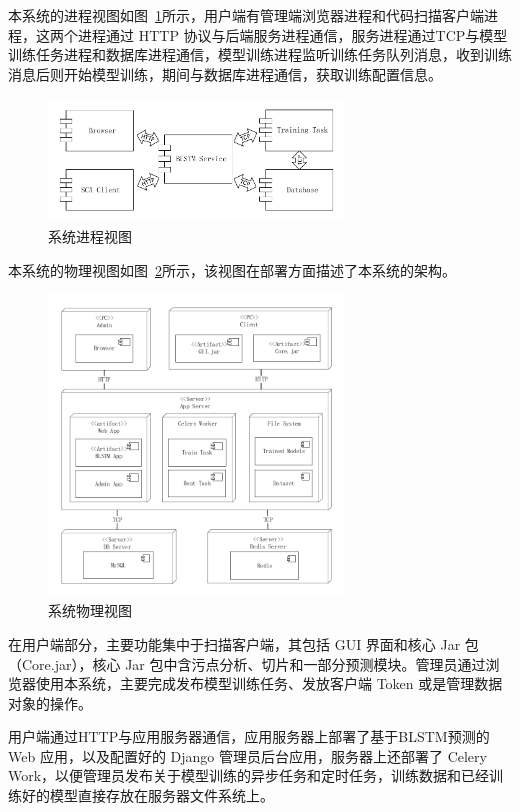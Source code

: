 本系统的进程视图如图~\ref{view:process}所示，用户端有管理端浏览器进程和代码扫描客户端进程，这两个进程通过 HTTP 协议与后端服务进程通信，服务进程通过TCP与模型训练任务进程和数据库进程通信，模型训练进程监听训练任务队列消息，收到训练消息后则开始模型训练，期间与数据库进程通信，获取训练配置信息。

\begin{figure}[!htb]
	\centering
	\includegraphics[width=0.7\textwidth]{FIGs/chapter3/viewprocess.pdf}
	\caption{系统进程视图}\label{view:process}
\end{figure}

本系统的物理视图如图~\ref{view:physical}所示，该视图在部署方面描述了本系统的架构。

\begin{figure}[!htb]
    \centering
    \includegraphics[width=0.7\textwidth]{FIGs/chapter3/viewphysical.pdf}
    \caption{系统物理视图}\label{view:physical}
\end{figure}

在用户端部分，主要功能集中于扫描客户端，其包括 GUI 界面和核心 Jar 包（Core.jar），核心 Jar 包中含污点分析、切片和一部分预测模块。管理员通过浏览器使用本系统，主要完成发布模型训练任务、发放客户端 Token 或是管理数据对象的操作。

用户端通过HTTP与应用服务器通信，应用服务器上部署了基于BLSTM预测的 Web 应用，以及配置好的 Django 管理员后台应用，服务器上还部署了 Celery Work，以便管理员发布关于模型训练的异步任务和定时任务，训练数据和已经训练好的模型直接存放在服务器文件系统上。

